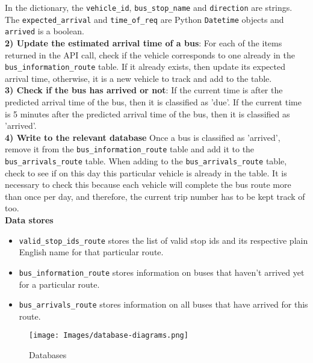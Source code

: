 \documentclass[12pt, a4paper]{article}
\begin{document}
In the dictionary, the \texttt{vehicle\_id}, \texttt{bus\_stop\_name} and \texttt{direction} are strings. The \texttt{expected\_arrival} and \texttt{time\_of\_req} are Python \texttt{Datetime} objects and \texttt{arrived} is a boolean. \\

\textbf{2) Update the estimated arrival time of a bus}: For each of the items returned in the API call, check if the vehicle corresponds to one already in the \texttt{bus\_information\_route} table. If it already exists, then update its expected arrival time, otherwise, it is a new vehicle to track and add to the table. \\

\textbf{3) Check if the bus has arrived or not}:  If the current time is after the predicted arrival time of the bus, then it is classified as 'due'. If the current time is 5 minutes after the predicted arrival time of the bus, then it is classified as 'arrived'. \\

\textbf{4) Write to the relevant database} Once a bus is classified as 'arrived', remove it from the \texttt{bus\_information\_route} table and add it to the \texttt{bus\_arrivals\_route} table. When adding to the \texttt{bus\_arrivals\_route} table, check to see if on this day this particular vehicle is already in the table. It is necessary to check this because each vehicle will complete the bus route more than once per day, and therefore, the current trip number has to be kept track of too. \\

\textbf{Data stores}

\begin{itemize}
    \item \texttt{valid\_stop\_ids\_route} stores the list of valid stop ids and its respective plain English name for that particular route. 
    \item \texttt{bus\_information\_route} stores information on buses that haven't arrived yet for a particular route.
    \item \texttt{bus\_arrivals\_route} stores information on all buses that have arrived for this route. 
\end{itemize}

\begin{figure}[H]
\begin{center}
    \texttt{[image: Images/database-diagrams.png]}
    \caption{Databases}
    \label{fig:databases}
\end{center}
\end{figure}
\end{document}
